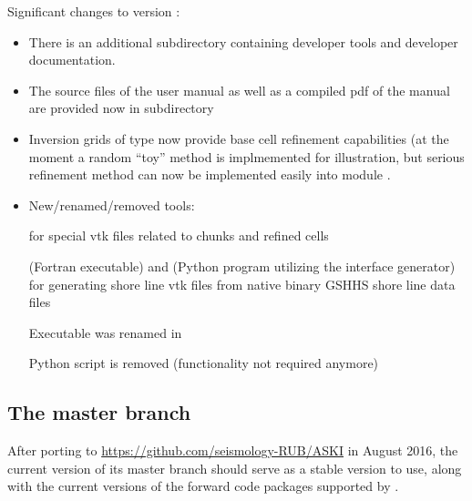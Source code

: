 Significant changes to version :
\begin{itemize}
\item 
There is an additional subdirectory  containing developer tools and developer documentation.

\item
The source files of the \ASKI{} user manual as well as a compiled pdf of the manual are provided now in subdirectory

\item 
Inversion grids of type  now provide base cell refinement capabilities (at the moment
a random ``toy'' method is implmemented for illustration, but serious refinement method can now be implemented
easily into module .

\item New/renamed/removed tools:

   for special vtk files related to chunks and refined cells 

   (Fortran executable) and  (Python program
  utilizing the  interface generator) for generating shore line vtk files from native binary GSHHS 
  shore line data files

  Executable  was renamed in 

  Python script  is removed (functionality not required anymore)
\end{itemize}

\subsection*{The  master branch}
After porting \ASKI{} to \url{https://github.com/seismology-RUB/ASKI} in August 2016, the current version of its
master branch should serve as a stable version to use, along with the current versions of the forward code 
packages supported by \ASKI{}.

